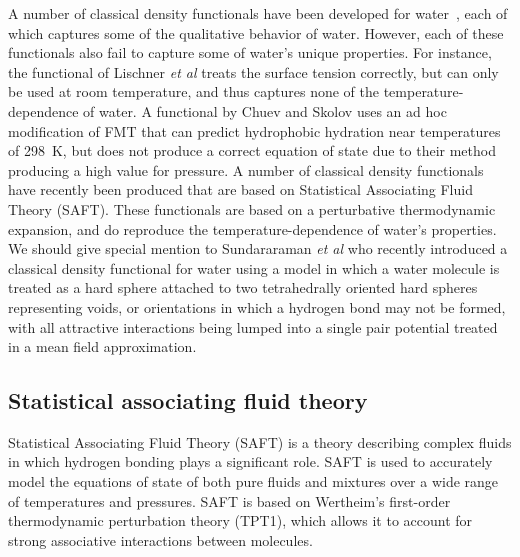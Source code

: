\documentclass[twocolumn,amsmath,amssymb,prl]{revtex4-1}
\begin{document}
A number of classical density functionals have been developed for
water~\cite{ding1987, Yang1992, yang1994density, gloor2002saft,
  gloor2004accurate, gloor2007prediction, Jaqaman2004,
  clark2006developing, chuev2006, lischner2010classical,
  fu2005vapor-liquid-dft,kiselev2006new, blas2001examination,
  sundararaman2012computationally}, each of
which captures some of the qualitative behavior of water.  However,
each of these functionals also fail to capture some of water's unique
properties.  For instance, the functional of Lischner \emph{et
  al}\cite{lischner2010classical} treats the surface tension
correctly, but can only be used at room temperature, and thus captures
none of the temperature-dependence of water.  A functional by Chuev
and Skolov\cite{chuev2006} uses an ad hoc modification of FMT that can
predict hydrophobic hydration near temperatures of 298~K, but does not
produce a correct equation of state due to their method producing a
high value for pressure.
A number of classical density functionals
have recently been produced that are based on Statistical Associating
Fluid Theory (SAFT)\cite{ segura1997associating, segura1998comparison,
  yu2002fmt-dft-inhomogeneous-associating,
  fu2005vapor-liquid-dft,gloor2002saft,muller2001molecular,
 clark2006developing, gloor2007prediction, gloor2004accurate,
  gross2009density, kahl2008modified, blas2001examination}.  These
functionals are based on a perturbative thermodynamic expansion, and
do reproduce the temperature-dependence of water's properties.
% 
We should give special mention to Sundararaman \emph{et al} who
recently introduced a classical density functional for water using a
model in which a water molecule is treated as a hard sphere attached to
two tetrahedrally oriented hard spheres representing voids, or
orientations in which a hydrogen bond may not be formed, with all
attractive interactions being lumped into a single pair potential
treated in a mean field
approximation\cite{sundararaman2012computationally}.

\subsection{Statistical associating fluid theory}

Statistical Associating Fluid Theory (SAFT) is a theory describing
complex fluids in which hydrogen bonding plays a significant
role\cite{chapman1989saft, muller2001molecular}.  SAFT is used to
accurately model the equations of state of both pure fluids and
mixtures over a wide range of temperatures and pressures.  SAFT is
based on Wertheim's first-order thermodynamic perturbation theory
(TPT1)\cite{wertheim1984fluidsI, wertheim1984fluidsII,
  wertheim1986fluidsIII, wertheim1986fluidsIV}, which allows it to
account for strong associative interactions between molecules.
\end{document}
